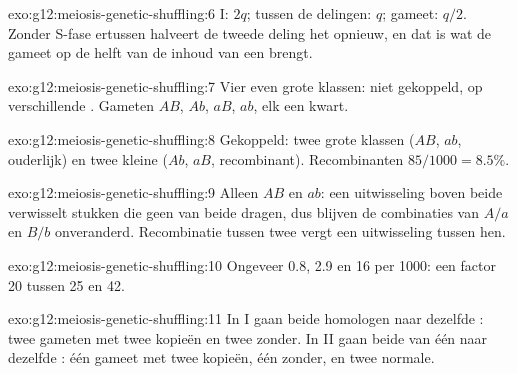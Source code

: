 \begin{solution}{exo:g12:meiosis-genetic-shuffling:6}
 I: $2q$; tussen de delingen: $q$; gameet: $q/2$. Zonder S-fase
ertussen halveert de tweede deling het  opnieuw, en dat is wat de
gameet op de helft van de inhoud van een   brengt.
\end{solution}

\begin{solution}{exo:g12:meiosis-genetic-shuffling:7}
Vier even grote klassen: niet gekoppeld, op verschillende .
Gameten $AB$, $Ab$, $aB$, $ab$, elk een kwart.
\end{solution}

\begin{solution}{exo:g12:meiosis-genetic-shuffling:8}
Gekoppeld: twee grote klassen ($AB$, $ab$, ouderlijk) en twee kleine
($Ab$, $aB$, recombinant). Recombinanten $85/1000 = 8.5\%$.
\end{solution}

\begin{solution}{exo:g12:meiosis-genetic-shuffling:9}
Alleen $AB$ en $ab$: een uitwisseling boven beide  verwisselt stukken
die geen van beide dragen, dus blijven de combinaties van $A/a$ en $B/b$
onveranderd. Recombinatie tussen twee  vergt een uitwisseling
tussen hen.
\end{solution}

\begin{solution}{exo:g12:meiosis-genetic-shuffling:10}
Ongeveer 0.8, 2.9 en 16 per 1000: een factor 20 tussen 25 en 42.
\end{solution}

\begin{solution}{exo:g12:meiosis-genetic-shuffling:11}
In  I gaan beide homologen naar dezelfde : twee gameten met twee
kopieën en twee zonder. In  II gaan beide  van één
 naar dezelfde : één gameet met twee kopieën, één zonder, en
twee normale.
\end{solution}

